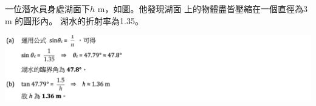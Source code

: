 {
    一位潛水員身處湖面下$h$ m，如圖。他發現湖面 上的物體盡皆壓縮在一個直徑為3 m 的圓形內。 湖水的折射率為1.35。
}{\par{\par\centering\includegraphics[width=\textwidth]{./img/ch2_refraction_lq_2024-05-18-17-35-04.png}\par}}

